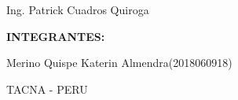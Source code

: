 \documentclass[12pt,letterpaper]{article}
\begin{document}
\begin{titlepage}
\begin{center}
\vspace*{0.1in}
\begin{large}
 Ing. Patrick Cuadros Quiroga\\
\end{large}

\vspace*{0.4in}
\vspace*{0.1in}
\begin{large}
\textbf{INTEGRANTES:} \\
\begin{flushleft}
Merino Quispe Katerin Almendra\hfill	(2018060918)\\

\centering  %
\vspace*{0.9in}
\begin{large}
TACNA - PERU
\end{large}

\end{flushleft}
\end{large}
\end{center}

\end{titlepage}


\tableofcontents %
\thispagestyle{empty} %
\newpage
\setcounter{page}{1} %




\end{document}
